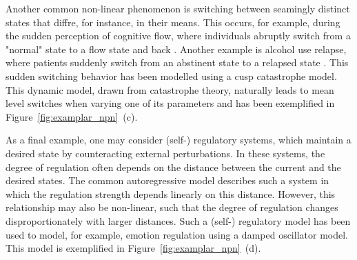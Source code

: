 \documentclass[man, floatsintext]{apa7}
\begin{document}
Another common non-linear phenomenon is switching between seamingly distinct
states that diffre, for instance, in their means. This occurs, for example,
during the sudden perception of cognitive flow, where individuals abruptly
switch from a "normal" state to a flow state and back
\parencite{ceja_suddenly_2012}. Another example is alcohol use relapse, where
patients suddenly switch from an abstinent state to a relapsed state
\parencite{witkiewitz_modeling_2007}. This sudden switching behavior has been
modelled using a cusp catastrophe model. This dynamic model, drawn from
catastrophe theory, naturally leads to mean level switches when varying one of
its parameters \parencite{van_der_maas_sudden_2003,chow_cusp_2015} and has been
exemplified in Figure~\ref{fig:examplar_npn}~(c).

As a final example, one may consider (self-) regulatory systems, which maintain
a desired state by counteracting external perturbations. In these systems, the
degree of regulation often depends on the distance
between the current and the desired states. The common autoregressive model
describes such a system in which the regulation strength depends linearly on
this distance. However, this relationship may also be non-linear, such that the
degree of regulation changes disproportionately with larger distances. Such a
(self-) regulatory model has been used to model, for example, emotion
regulation \parencite{chow_emotion_2005} using a damped oscillator model. This
model is exemplified in Figure~\ref{fig:examplar_npn}~(d).
\end{document}
